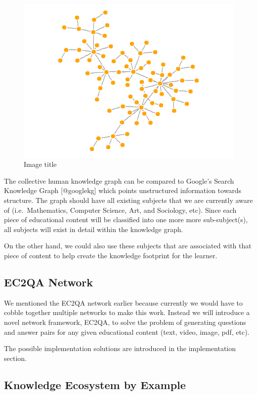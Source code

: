 \documentclass{acm_proc_article-sp}
\begin{document}
\begin{figure}
\centering
\includegraphics{img/knowledge_graphy.png}
\caption{Image title}
\end{figure}

The collective human knowledge graph can be compared to Google's Search
Knowledge Graph {[}@googlekg{]} which points unstructured information
towards structure. The graph should have all existing subjects that we
are currently aware of (i.e.~Mathematics, Computer Science, Art, and
Sociology, etc). Since each piece of educational content will be
classified into one more more sub-subject(s), all subjects will exist in
detail within the knowledge graph.

On the other hand, we could also use these subjects that are associated
with that piece of content to help create the knowledge footprint for
the learner.

\subsection{EC2QA Network}\label{ec2qa-network}

We mentioned the EC2QA network earlier because currently we would have
to cobble together multiple networks to make this work. Instead we will
introduce a novel network framework, EC2QA, to solve the problem of
generating questions and answer pairs for any given educational content
(text, video, image, pdf, etc).

The possible implementation solutions are introduced in the
implementation section.

\subsection{Knowledge Ecosystem by
Example}\label{knowledge-ecosystem-by-example}
\end{document}
